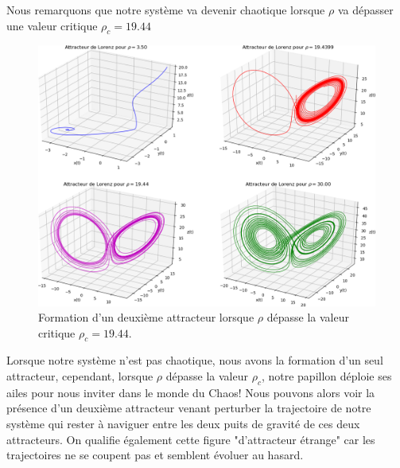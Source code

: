 \documentclass[%
oneside,                 %
final,                   %
10pt]{article}
\begin{document}
Nous remarquons que notre système va devenir chaotique lorsque $\rho$ va dépasser une valeur critique $\rho_c = 19.44$


\begin{figure}[!ht]  %
  \centerline{\includegraphics[width=0.7\linewidth]{scripts/lorenz_ode_r.png}}
  \caption{
  Formation d'un deuxième attracteur lorsque $\rho$ dépasse la valeur critique $\rho_c = 19.44$.
  }
\end{figure}


Lorsque notre système n'est pas chaotique, nous avons la formation d'un seul attracteur, cependant, lorsque $\rho$ dépasse la valeur $\rho_c$, notre papillon déploie ses ailes pour nous inviter dans le monde du Chaos! Nous pouvons alors voir la présence d'un deuxième attracteur venant perturber la trajectoire de notre système qui rester à naviguer entre les deux puits de gravité de ces deux attracteurs. On qualifie également cette figure "d'attracteur étrange" car les trajectoires ne se coupent pas et semblent évoluer au hasard.


\end{document}
